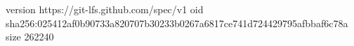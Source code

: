 version https://git-lfs.github.com/spec/v1
oid sha256:025412af0b90733a820707b30233b0267a6817ce741d724429795afbbaf6c78a
size 262240
